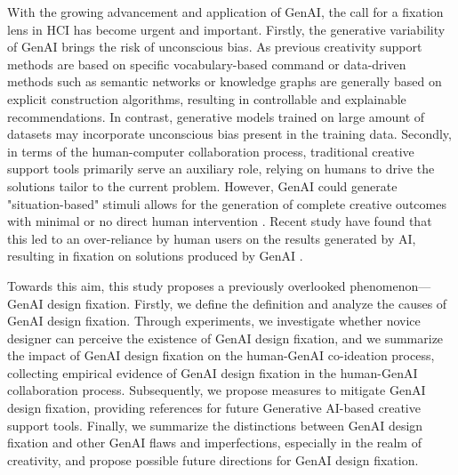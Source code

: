 
With the growing advancement and application of GenAI, the call for a fixation lens in HCI has become urgent and important. Firstly, the generative variability of GenAI brings the risk of unconscious bias. As previous creativity support methods are based on specific vocabulary-based command or data-driven methods such as semantic networks \cite{luo2019computer, shi2017data} or knowledge graphs are generally based on explicit construction algorithms, resulting in controllable and explainable recommendations. In contrast, generative models trained on large amount of datasets may incorporate unconscious bias present in the training data. Secondly, in terms of the human-computer collaboration process, traditional creative support tools primarily serve an auxiliary role, relying on humans to drive the solutions tailor to the current problem. However, GenAI could generate "situation-based" stimuli allows for the generation of complete creative outcomes with minimal or no direct human intervention \cite{zhu2023generative}. Recent study have found that this led to an over-reliance by human users on the results generated by AI, resulting in fixation on solutions produced by GenAI \cite{wadinambiarachchi2024effects}.

Towards this aim, this study proposes a previously overlooked phenomenon—GenAI design fixation. Firstly, we define the definition and analyze the causes of GenAI design fixation. Through experiments, we investigate whether novice designer can perceive the existence of GenAI design fixation, and we summarize the impact of GenAI design fixation on the human-GenAI co-ideation process, collecting empirical evidence of GenAI design fixation in the human-GenAI collaboration process. Subsequently, we propose measures to mitigate GenAI design fixation, providing references for future Generative AI-based creative support tools. Finally, we summarize the distinctions between GenAI design fixation and other GenAI flaws and imperfections, especially in the realm of creativity, and propose possible future directions for GenAI design fixation.

